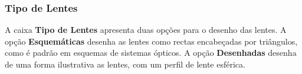 \documentclass[a4paper,12pt]{article}
\begin{document}
\subsubsection{Tipo de Lentes} 

A caixa {\bf Tipo de Lentes} apresenta duas opções para o desenho das lentes. A opção {\bf Esquemáticas} desenha as lentes como rectas encabeçadas por triângulos, como é padrão em esquemas de sistemas ópticos. A opção {\bf Desenhadas} desenha de uma forma ilustrativa as lentes, com um perfil de lente esférica.
\par

\par
\end{document}
